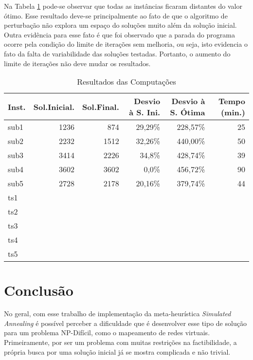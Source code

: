 \documentclass{article}
\begin{document}
Na Tabela \ref{tab:Resultado} pode-se observar que todas as instâncias ficaram distantes do valor ótimo. Esse resultado deve-se principalmente ao fato de que o algoritmo de perturbação não explora um espaço do soluções muito além da solução inicial. Outra evidência para esse fato é que foi observado que a parada do programa ocorre pela condição do limite de iterações sem melhoria, ou seja, isto evidencia o fato da falta de variabilidade das soluções testadas. Portanto, o aumento do limite de iterações não deve mudar os resultados.

\begin{table}[H]
\centering
\begin{tabular}{|l | r | r | r | r | r|}
	\hline
	\textbf{Inst.} & \textbf{Sol.Inicial.} & \textbf{Sol.Final.} & \textbf{Desvio à S. Ini.} & \textbf{Desvio à S. Ótima} & \textbf{Tempo (min.)} \\ \hline
	sub1	& 1236	& 874	& 29,29\%	& 228,57\%	& 25	\\ \hline
	sub2	& 2232	& 1512	& 32,26\%	& 440,00\%	& 50	\\ \hline
	sub3	& 3414	& 2226	& 34,8\%	& 428,74\%	& 39	\\ \hline
	sub4	& 3602	& 3602 	& 0,0\%		& 456,72\%	& 90	\\ \hline
	sub5	& 2728	& 2178	& 20,16\%	& 379,74\%	& 44	\\ \hline
	ts1		& 	& 	& 	& 	& 	\\ \hline
	ts2		& 	& 	& 	& 	& 	\\ \hline
	ts3		& 	& 	& 	& 	& 	\\ \hline
	ts4		& 	& 	& 	& 	& 	\\ \hline
	ts5		& 	& 	& 	& 	& 	\\ \hline
\end{tabular}
\caption{Resultados das Computações}
\label{tab:Resultado}
\end{table}

\section{Conclusão}
No geral, com esse trabalho de implementação da meta-heurística \emph{Simulated Annealing} é possível perceber a dificuldade que é desenvolver esse tipo de solução para um problema NP-Difícil, como o mapeamento de redes virtuais. Primeiramente, por ser um problema com muitas restrições na factibilidade, a própria busca por uma solução inicial já se mostra complicada e não trivial.
\end{document}
